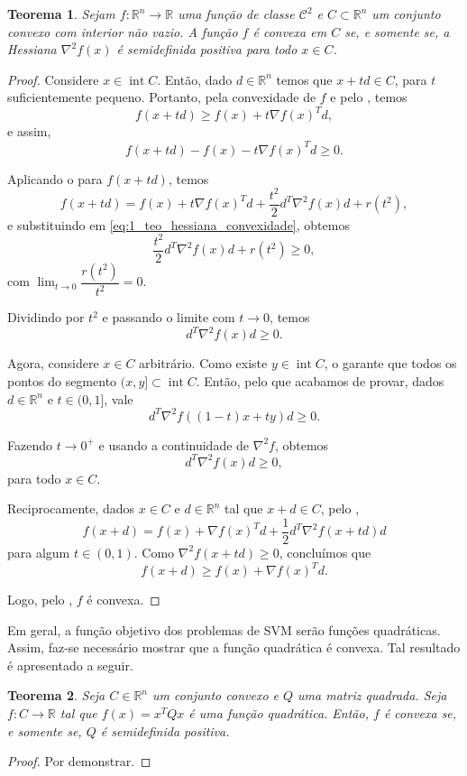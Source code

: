\documentclass[12pt,a4paper]{scrartcl}
\DeclareMathOperator{\interior}{int}
\def\RR{\mathds{R}}
\newtheorem{teo}{Teorema}
\theoremstyle{definition}%
\begin{document}
\begin{teo} \label{teo:hessiana_convexidade}
Sejam $f:\RR^{n} \rightarrow \RR $ uma função de classe $\mathcal{C}^{2}$ e $C \subset \RR^{n}$ um conjunto convexo com interior não vazio. A função $f$ é convexa em $C$ se, e somente se, a Hessiana $\nabla^{2} f(x)$ é semidefinida positiva para todo $x \in C$.
\end{teo}
\begin{proof}
Considere $x \in \interior C$. Então, dado $d \in \RR^{n}$ temos que $x+td \in C$, para $t$ suficientemente pequeno. Portanto, pela convexidade de $f$ e pelo , temos
\[
f(x+td) \geq f(x) + t\nabla f(x)^{T} d ,
\]
e assim, 
\[ \label{eq:1_teo_hessiana_convexidade}
f(x+td) -f(x) - t\nabla f(x)^{T} d \geq 0 . 
\]

Aplicando o  para $f(x+td)$, temos
\[
f(x+td) = f(x) + t\nabla f(x)^{T}d + \dfrac{t^{2}}{2}d^{T} \nabla^{2} f(x)d + r(t^{2}) ,
\]
e substituindo em \eqref{eq:1_teo_hessiana_convexidade}, obtemos
\[
\dfrac{t^{2}}{2}d^{T} \nabla^{2} f(x)d + r(t^{2}) \geq 0 ,
\]
com $\lim_{t \rightarrow 0} \dfrac{r(t^{2})}{t^{2}} = 0$. 

Dividindo por $t^{2}$ e passando o limite com $t \rightarrow 0$, temos
\[
d^{T} \nabla^{2} f(x)d \geq 0 .
\]

Agora, considere $x \in C$ arbitrário. Como existe $y \in \interior C$, o  garante que todos os pontos do segmento $(x,y] \subset \interior C$. Então, pelo que acabamos de provar, dados $d \in \RR^{n}$ e $t\in (0,1]$, vale
\[
d^{T} \nabla^{2} f((1-t)x+ty)d \geq 0 .
\]

Fazendo $t \rightarrow 0^{+}$ e usando a continuidade de $\nabla^{2} f$, obtemos
\[
d^{T} \nabla^{2} f(x)d \geq 0,
\]
para todo $x \in C$.

Reciprocamente, dados $x \in C$ e $d \in \RR^{n}$ tal que $x+d \in C$, pelo ,
\[
f(x+d) = f(x) + \nabla f(x)^{T}d + \dfrac{1}{2}d^{T} \nabla^{2} f(x+td)d
\]
para algum $t \in (0,1)$. Como $\nabla ^{2}f(x+td) \geq 0$, concluímos que 
\[
f(x+d) \geq f(x) + \nabla f(x)^{T}d .
\]

Logo, pelo , $f$ é convexa.
\end{proof}

Em geral, a função objetivo dos problemas de SVM serão funções quadráticas. Assim, faz-se necessário mostrar que a função quadrática é convexa. Tal resultado é apresentado a seguir.

\begin{teo}
Seja $C \in \RR^{n}$ um conjunto convexo e $Q$ uma matriz quadrada. Seja $f:C \rightarrow \RR$ tal que $f(x) = x^{T}Qx$ é uma função quadrática. Então, $f$ é convexa se, e somente se, $Q$ é semidefinida positiva.
\end{teo}
\begin{proof}
Por demonstrar.
\end{proof}





\newpage

\printbibliography
\end{document}
